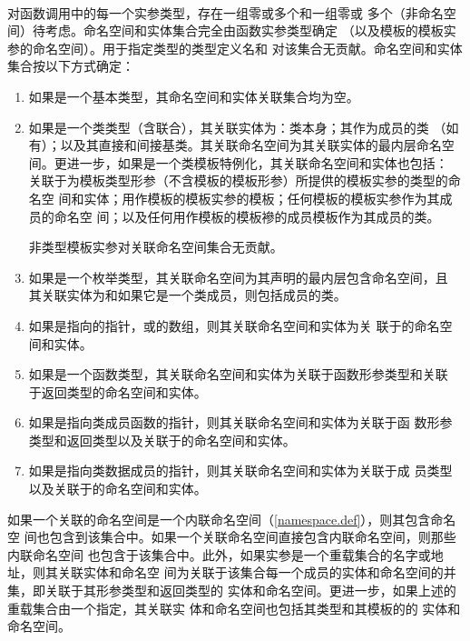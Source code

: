 \paragraph{} %
对函数调用中的每一个实参类型，存在一组零或多个和一组零或
多个（非命名空间）待考虑。命名空间和实体集合完全由函数实参类型确定
（以及模板的模板实参的命名空间）。用于指定类型的类型定义名和
对该集合无贡献。命名空间和实体集合按以下方式确定：
\begin{enumerate}
  \item 如果是一个基本类型，其命名空间和实体关联集合均为空。
  \item 如果是一个类类型（含联合），其关联实体为：类本身；其作为成员的类
        （如有）；以及其直接和间接基类。其关联命名空间为其关联实体的最内层命名空
        间。更进一步，如果是一个类模板特例化，其关联命名空间和实体也包括：
        关联于为模板类型形参（不含模板的模板形参）所提供的模板实参的类型的命名空
        间和实体；用作模板的模板实参的模板；任何模板的模板实参作为其成员的命名空
        间；以及任何用作模板的模板襂的成员模板作为其成员的类。

        \begin{note}
          非类型模板实参对关联命名空间集合无贡献。
        \end{note}
  \item 如果是一个枚举类型，其关联命名空间为其声明的最内层包含命名空间，且
        其关联实体为和如果它是一个类成员，则包括成员的类。
  \item 如果是指向的指针，或的数组，则其关联命名空间和实体为关
        联于的命名空间和实体。
  \item 如果是一个函数类型，其关联命名空间和实体为关联于函数形参类型和关联
        于返回类型的命名空间和实体。
  \item 如果是指向类成员函数的指针，则其关联命名空间和实体为关联于函
        数形参类型和返回类型以及关联于的命名空间和实体。
  \item 如果是指向类数据成员的指针，则其关联命名空间和实体为关联于成
        员类型以及关联于的命名空间和实体。
\end{enumerate}
如果一个关联的命名空间是一个内联命名空间（\ref{namespace.def}），则其包含命名空
间也包含到该集合中。如果一个关联命名空间直接包含内联命名空间，则那些内联命名空间
也包含于该集合中。此外，如果实参是一个重载集合的名字或地址，则其关联实体和命名空
间为关联于该集合每一个成员的实体和命名空间的并集，即关联于其形参类型和返回类型的
实体和命名空间。更进一步，如果上述的重载集合由一个指定，其关联实
体和命名空间也包括其类型和其模板的的
实体和命名空间。

